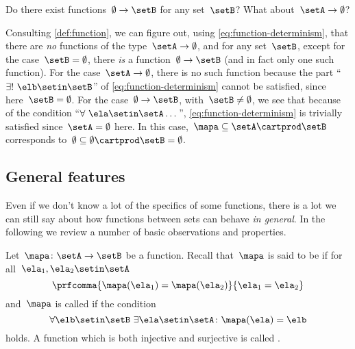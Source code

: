 Do there exist functions~$\emptyset \to \setB$ for any set~$\setB$?
What about~$\setA \to \emptyset$?

Consulting \cref{def:function}, we can figure out, using \cref{eq:function-determinism}, that there are \emph{no} functions of the type~$\setA \to \emptyset$, and for any set~$\setB$, except for the case~$\setB = \emptyset$, there \emph{is} a function~$\emptyset \to \setB$ (and in fact only one such function).
For the case~$\setA \to \emptyset$, there is no such function because the part ``$\exists !
    \ \elb \setin\setB$'' of \cref{eq:function-determinism} cannot be satisfied, since here~$\setB = \emptyset$.
For the case~$\emptyset \to \setB$, with~$\setB \neq \emptyset$, we see that because of the condition ``$\forall \ \ela \setin\setA \dots$'', \cref{eq:function-determinism} is trivially satisfied since~$\setA = \emptyset$ here.
In this case,~$\mapa \subseteq \setA \cartprod \setB$ corresponds to~$\emptyset \subseteq \emptyset \cartprod \setB = \emptyset$.

\subsection{General features}

Even if we don't know a lot of the specifics of some functions, there is a lot we can still say about how functions between sets can behave \emph{in general}.
In the following we review a number of basic observations and properties.

Let~$\mapa\colon \setA \to \setB$ be a function.
Recall that~$\mapa$ is said to be \emph{} if for all~$\ela_1, \ela_2 \setin\setA$
\begin{equation}
    \label{eq:injectivity-cond}
    \prfcomma{\mapa(\ela_1) = \mapa(\ela_2)}{\ela_1 = \ela_2}
\end{equation}
and~$\mapa$ is called \emph{} if the condition
\begin{equation}
    \label{eq:surjectivity-cond}
    \forall \elb \setin\setB \ \exists  \ela \setin\setA \colon \mapa(\ela) = \elb
\end{equation}
holds.
A function which is both injective and surjective is called \emph{}.

